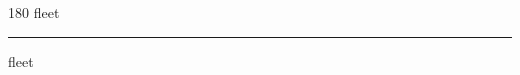 
\begin{frame}
\begin{center}
\begin{turn}{180}
{\fontsize{2.5cm}{1em}\selectfont fleet}
\end{turn}
\vspace{1em}\par  
\hrule
\vspace{1em}\par  
{\fontsize{2.5cm}{1em}\selectfont fleet}
\end{center}
\end{frame}
